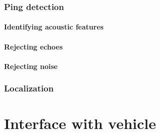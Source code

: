 \documentclass[10pt]{article}
\begin{document}
\subsubsection{Ping detection}

\paragraph{Identifying acoustic features}

\paragraph{Rejecting echoes}

\paragraph{Rejecting noise}

\subsubsection{Localization}

\section{Interface with vehicle}

\clearpage



\end{document}
